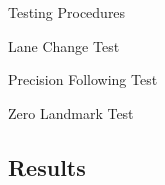 \documentclass{beamer}
\begin{document}
    \begin{frame}{Testing Procedures}
    \end{frame}

    \begin{frame}{Lane Change Test}
    \end{frame}

    \begin{frame}{Precision Following Test}
    \end{frame}

    \begin{frame}{Zero Landmark Test}
    \end{frame}

  \subsection{Results}
\end{document}
